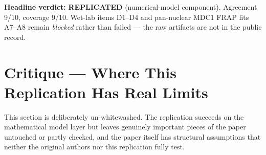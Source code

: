 \documentclass[11pt]{article}
\begin{document}
\textbf{Headline verdict:} \textbf{REPLICATED} (numerical-model component).
Agreement 9/10, coverage 9/10. Wet-lab items D1--D4 and pan-nuclear MDC1 FRAP fits A7--A8
remain \emph{blocked} rather than failed --- the raw artifacts are not in the public record.

\section{Critique --- Where This Replication Has Real Limits}

This section is deliberately un-whitewashed. The replication succeeds on the mathematical
model layer but leaves genuinely important pieces of the paper untouched or partly checked,
and the paper itself has structural assumptions that neither the original authors nor this
replication fully test.
\end{document}
